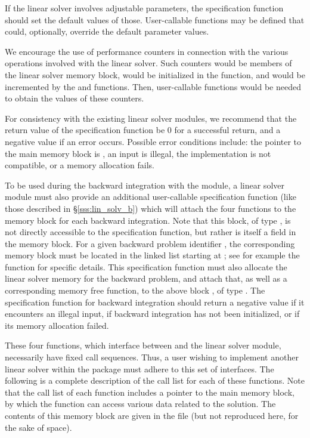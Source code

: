 If the linear solver involves adjustable parameters, the specification
function should set the default values of those.  User-callable
functions may be defined that could, optionally, override the default
parameter values.

We encourage the use of performance counters in connection with the various
operations involved with the linear solver.  Such counters would be
members of the linear solver memory block, would be initialized in the
 function, and would be incremented by the  and
 functions.  Then, user-callable functions would be needed to
obtain the values of these counters.

For consistency with the existing {\cvodes} linear solver modules, we
recommend that the return value of the specification function be 0 for
a successful return, and a negative value if an error occurs.
Possible error conditions include: the pointer to the main {\cvodes}
memory block is , an input is illegal, the {\nvector}
implementation is not compatible, or a memory allocation fails.

To be used during the backward integration with the {\cvodes} module,
a linear solver module must also provide an additional user-callable
specification function (like those described in \S\ref{sss:lin_solv_b})
which will attach the four functions to the {\cvodes} memory block for
each backward integration.
Note that this block, of type , is not directly accessible
to the specification function, but rather is itself a field in the
{\cvodes} memory block.  For a given backward problem identifier ,
the corresponding memory block must be located in the linked list starting
at ; see for example the function
 for specific details.
This specification function must also allocate the linear solver memory for
the backward problem, and attach that, as well as a corresponding memory free
function, to the above block , of type .
The specification function for backward integration should return a negative
value if it encounters an illegal input, if backward integration has
not been initialized, or if its memory allocation failed.

\vspace{0.1in}
These four functions, which interface between {\cvodes} and the linear solver module,
necessarily have fixed call sequences.  Thus, a user wishing to implement another 
linear solver within the {\cvodes} package must adhere to this set of interfaces.
The following is a complete description of the call list for each of
these functions.  Note that the call list of each function includes a
pointer to the main {\cvodes} memory block, by which the function can access
various data related to the {\cvodes} solution.  The contents of this memory
block are given in the file  (but not reproduced here, for
the sake of space).


